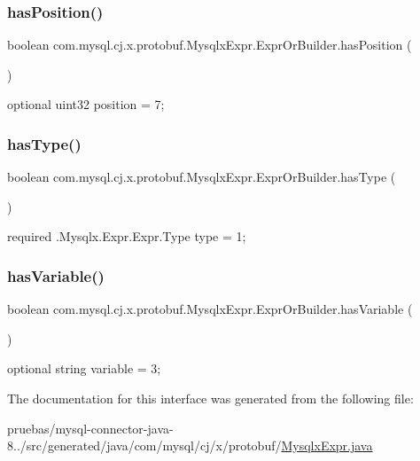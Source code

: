 \subsubsection{\texorpdfstring{has\+Position()}{hasPosition()}}
{\footnotesize\ttfamily boolean com.\+mysql.\+cj.\+x.\+protobuf.\+Mysqlx\+Expr.\+Expr\+Or\+Builder.\+has\+Position (\begin{DoxyParamCaption}{ }\end{DoxyParamCaption})}

{\ttfamily optional uint32 position = 7;} \mbox{\label{interfacecom_1_1mysql_1_1cj_1_1x_1_1protobuf_1_1_mysqlx_expr_1_1_expr_or_builder_a704435dcecb8f35a1673277d2b9b0584}} 
\subsubsection{\texorpdfstring{has\+Type()}{hasType()}}
{\footnotesize\ttfamily boolean com.\+mysql.\+cj.\+x.\+protobuf.\+Mysqlx\+Expr.\+Expr\+Or\+Builder.\+has\+Type (\begin{DoxyParamCaption}{ }\end{DoxyParamCaption})}

{\ttfamily required .Mysqlx.\+Expr.\+Expr.\+Type type = 1;} \mbox{\label{interfacecom_1_1mysql_1_1cj_1_1x_1_1protobuf_1_1_mysqlx_expr_1_1_expr_or_builder_ae660c7bec97f5ae9f3086fbd8a042648}} 
\subsubsection{\texorpdfstring{has\+Variable()}{hasVariable()}}
{\footnotesize\ttfamily boolean com.\+mysql.\+cj.\+x.\+protobuf.\+Mysqlx\+Expr.\+Expr\+Or\+Builder.\+has\+Variable (\begin{DoxyParamCaption}{ }\end{DoxyParamCaption})}

{\ttfamily optional string variable = 3;} 

The documentation for this interface was generated from the following file\+:\begin{DoxyCompactItemize}
\item 
pruebas/mysql-\/connector-\/java-\/8../src/generated/java/com/mysql/cj/x/protobuf/\mbox{\hyperlink{_mysqlx_expr_8java}{Mysqlx\+Expr.\+java}}\end{DoxyCompactItemize}
